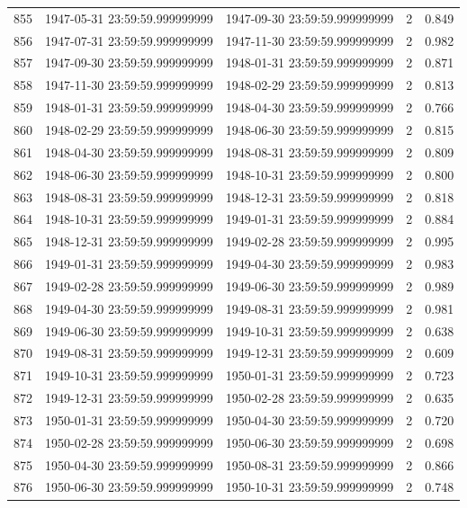 \begin{table}
\begin{tabular}{lcccc}
855 & 1947-05-31 23:59:59.999999999 & 1947-09-30 23:59:59.999999999 & 2 & 0.849 \\
856 & 1947-07-31 23:59:59.999999999 & 1947-11-30 23:59:59.999999999 & 2 & 0.982 \\
857 & 1947-09-30 23:59:59.999999999 & 1948-01-31 23:59:59.999999999 & 2 & 0.871 \\
858 & 1947-11-30 23:59:59.999999999 & 1948-02-29 23:59:59.999999999 & 2 & 0.813 \\
859 & 1948-01-31 23:59:59.999999999 & 1948-04-30 23:59:59.999999999 & 2 & 0.766 \\
860 & 1948-02-29 23:59:59.999999999 & 1948-06-30 23:59:59.999999999 & 2 & 0.815 \\
861 & 1948-04-30 23:59:59.999999999 & 1948-08-31 23:59:59.999999999 & 2 & 0.809 \\
862 & 1948-06-30 23:59:59.999999999 & 1948-10-31 23:59:59.999999999 & 2 & 0.800 \\
863 & 1948-08-31 23:59:59.999999999 & 1948-12-31 23:59:59.999999999 & 2 & 0.818 \\
864 & 1948-10-31 23:59:59.999999999 & 1949-01-31 23:59:59.999999999 & 2 & 0.884 \\
865 & 1948-12-31 23:59:59.999999999 & 1949-02-28 23:59:59.999999999 & 2 & 0.995 \\
866 & 1949-01-31 23:59:59.999999999 & 1949-04-30 23:59:59.999999999 & 2 & 0.983 \\
867 & 1949-02-28 23:59:59.999999999 & 1949-06-30 23:59:59.999999999 & 2 & 0.989 \\
868 & 1949-04-30 23:59:59.999999999 & 1949-08-31 23:59:59.999999999 & 2 & 0.981 \\
869 & 1949-06-30 23:59:59.999999999 & 1949-10-31 23:59:59.999999999 & 2 & 0.638 \\
870 & 1949-08-31 23:59:59.999999999 & 1949-12-31 23:59:59.999999999 & 2 & 0.609 \\
871 & 1949-10-31 23:59:59.999999999 & 1950-01-31 23:59:59.999999999 & 2 & 0.723 \\
872 & 1949-12-31 23:59:59.999999999 & 1950-02-28 23:59:59.999999999 & 2 & 0.635 \\
873 & 1950-01-31 23:59:59.999999999 & 1950-04-30 23:59:59.999999999 & 2 & 0.720 \\
874 & 1950-02-28 23:59:59.999999999 & 1950-06-30 23:59:59.999999999 & 2 & 0.698 \\
875 & 1950-04-30 23:59:59.999999999 & 1950-08-31 23:59:59.999999999 & 2 & 0.866 \\
876 & 1950-06-30 23:59:59.999999999 & 1950-10-31 23:59:59.999999999 & 2 & 0.748 \\

\end{tabular}
\end{table}
